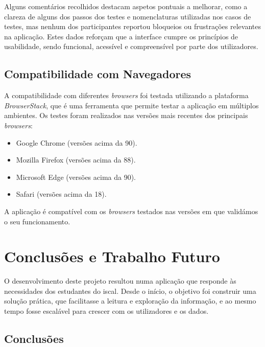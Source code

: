 Alguns comentários recolhidos destacam aspetos pontuais a melhorar, como a clareza de alguns dos passos dos testes e nomenclaturas utilizadas nos casos de testes, mas nenhum dos participantes reportou bloqueios ou frustrações relevantes na aplicação. Estes dados reforçam que a interface cumpre os princípios de usabilidade, sendo funcional, acessível e compreensível por parte dos utilizadores.

\section{Compatibilidade com Navegadores}

A compatibilidade com diferentes \textit{browsers} foi testada utilizando a plataforma \textit{BrowserStack}, que é uma ferramenta que permite testar a aplicação em múltiplos ambientes. Os testes foram realizados nas versões mais recentes dos principais \textit{browsers}:

\begin{itemize}
    \item Google Chrome (versões acima da 90).
    \item Mozilla Firefox (versões acima da 88).
    \item Microsoft Edge (versões acima da 90).
    \item Safari (versões acima da 18).
\end{itemize}

A aplicação é compatível com os \textit{browsers} testados nas versões em que validámos o seu funcionamento.

\chapter{Conclusões e Trabalho Futuro}
\label{ch:conclusoesTrabalhoFuturo}

O desenvolvimento deste projeto resultou numa aplicação que responde às necessidades dos estudantes do \gls{iscal}. Desde o início, o objetivo foi construir uma solução prática, que facilitasse a leitura e exploração da informação, e ao mesmo tempo fosse escalável para crescer com os utilizadores e os dados.

\section{Conclusões}

